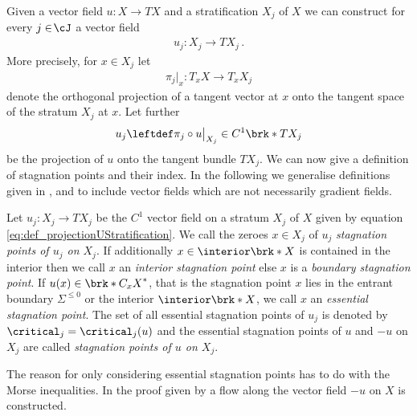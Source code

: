 Given a vector field $u\colon X\to TX$ and a stratification $X_j$ of $X$ we can construct for every
$j\in\!\cJ$ a vector field
\begin{align*}
  u_j\colon X_j\to TX_j\,.
\end{align*}
More precisely, for $x\in X_j$ let
\begin{align}
  \pi_j\big\vert_x\colon T_xX\to T_xX_{j}\label{eq:def_projectionStratification}
\end{align}
denote the orthogonal projection of a tangent vector at $x$ onto the tangent space of the stratum $X_j$ at $x$.
Let further
\begin{align}
  u_j\leftdef\pi_j\circ u\big\vert_{X_j}\in C^1\brk*{TX_j}\label{eq:def_projectionUStratification}
\end{align}
be the projection of $u$ onto the tangent bundle $TX_j$. We can now give a definition
of stagnation points and their index. 
In the following we generalise definitions given in \cite[p.138f]{Shelton1980}, \cite[§5]{Morse1969} and \cite[p.282f]{Morse1970}
to include vector fields which are not necessarily gradient fields.
\begin{definition}\label{df:stagnationPoints}
  Let $u_j\colon X_j\to TX_j$ be the $C^1$ vector field on a stratum $X_j$ of $X$ given by equation \eqref{eq:def_projectionUStratification}.
  We call the zeroes $x\in X_j$ of $u_j$ \emph{stagnation points of $u_j$ on $X_j$}.
  If additionally $x\in\openX$ is contained in the interior
  then we call $x$ an \emph{interior stagnation point}
  else $x$ is a \emph{boundary stagnation point}.
  If $u(x)\in\brk*{C_xX}^*$, that is the stagnation point $x$ lies in the entrant boundary $\Sigma^{\leq0}$ or the interior $\interior\brk*{X}$, we call $x$ an \emph{essential stagnation point}.
  The set of all essential stagnation points of $u_j$ is denoted by $\critical_j=\critical_j(u)$ and
  the essential stagnation points of $u$ and $-u$ on $X_j$ are called \emph{stagnation points of $u$ on $X_j$}.
\end{definition}
The reason for only considering essential stagnation points has to do with the Morse inequalities.
In the proof given by \cite{Handron2002} a flow along the vector field $-u$ on $X$ is constructed.
